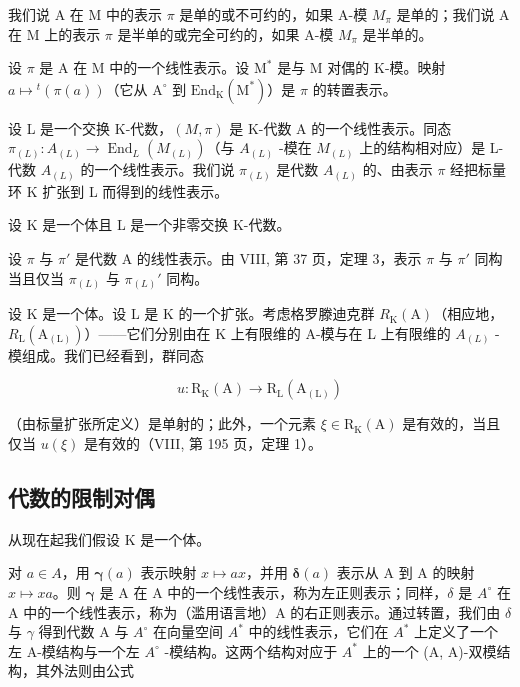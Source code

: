 我们说 A 在 M 中的表示 \(\pi\) 是单的或不可约的，如果 A-模 \(M_{\pi}\) 是单的；我们说 A 在 M 上的表示 \(\pi\) 是半单的或完全可约的，如果 A-模 \(M_{\pi}\) 是半单的。

设 \(\pi\) 是 A 在 M 中的一个线性表示。设 \(\mathrm{M}^*\) 是与 M 对偶的 K-模。映射 \(a\mapsto{}^{t}(\pi (a))\)（它从 \(\mathrm{A}^{\circ}\) 到 \(\mathrm{End}_{\mathrm{K}}(\mathrm{M}^{*})\)）是 \(\pi\) 的转置表示。

设 L 是一个交换 K-代数，\((M,\pi)\) 是 K-代数 A 的一个线性表示。同态 \(\pi_{(L)}:A_{(L)}\to\operatorname{End}_{L}(M_{(L)})\)（与 \(A_{(L)}\) -模在 \(M_{(L)}\) 上的结构相对应）是 L-代数 \(A_{(L)}\) 的一个线性表示。我们说 \(\pi_{(L)}\) 是代数 \(A_{(L)}\) 的、由表示 \(\pi\) 经把标量环 K 扩张到 L 而得到的线性表示。

设 K 是一个体且 L 是一个非零交换 K-代数。

设 \(\pi\) 与 \(\pi'\) 是代数 A 的线性表示。由 VIII, 第 37 页，定理 3，表示 \(\pi\) 与 \(\pi'\) 同构当且仅当 \(\pi_{(L)}\) 与 \(\pi_{(L)}'\) 同构。

设 K 是一个体。设 L 是 K 的一个扩张。考虑格罗滕迪克群 \(R_{\mathrm{K}}(\mathrm{A})\)（相应地，\(R_{\mathrm{L}}(\mathrm{A}_{(\mathrm{L})})\)）——它们分别由在 K 上有限维的 A-模与在 L 上有限维的 \(A_{(L)}\) -模组成。我们已经看到，群同态

\[
u: \mathrm{R} _ {\mathrm{K}} (\mathrm{A}) \longrightarrow \mathrm{R} _ {\mathrm{L}} (\mathrm{A} _ {(\mathrm{L})})
\]

（由标量扩张所定义）是单射的；此外，一个元素 \(\xi \in \mathrm{R}_{\mathrm{K}}(\mathrm{A})\) 是有效的，当且仅当 \(u(\xi)\) 是有效的（VIII, 第 195 页，定理 1）。

\subsection{代数的限制对偶}

从现在起我们假设 K 是一个体。

对 \(a \in A\)，用 \(\boldsymbol{\gamma}(a)\) 表示映射 \(x \mapsto ax\)，并用 \(\boldsymbol{\delta}(a)\) 表示从 A 到 A 的映射 \(x \mapsto xa\)。则 \(\boldsymbol{\gamma}\) 是 A 在 A 中的一个线性表示，称为左正则表示；同样，\(\delta\) 是 \(A^{\circ}\) 在 A 中的一个线性表示，称为（滥用语言地）A 的右正则表示。通过转置，我们由 \(\delta\) 与 \(\gamma\) 得到代数 A 与 \(A^{\circ}\) 在向量空间 \(A^{*}\) 中的线性表示，它们在 \(A^{*}\) 上定义了一个左 A-模结构与一个左 \(A^{\circ}\) -模结构。这两个结构对应于 \(A^{*}\) 上的一个 (A, A)-双模结构，其外法则由公式

